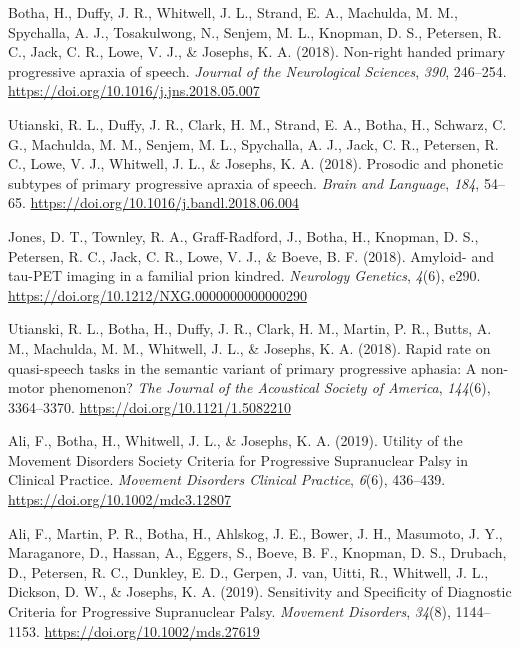 \documentclass[11pt, a4paper]{awesome-cv}
\begin{document}
\leavevmode\hypertarget{ref-botha_non-right_2018}{}%
Botha, H., Duffy, J. R., Whitwell, J. L., Strand, E. A., Machulda, M.
M., Spychalla, A. J., Tosakulwong, N., Senjem, M. L., Knopman, D. S.,
Petersen, R. C., Jack, C. R., Lowe, V. J., \& Josephs, K. A. (2018).
Non-right handed primary progressive apraxia of speech. \emph{Journal of
the Neurological Sciences}, \emph{390}, 246--254.
\url{https://doi.org/10.1016/j.jns.2018.05.007}

\leavevmode\hypertarget{ref-utianski_prosodic_2018}{}%
Utianski, R. L., Duffy, J. R., Clark, H. M., Strand, E. A., Botha, H.,
Schwarz, C. G., Machulda, M. M., Senjem, M. L., Spychalla, A. J., Jack,
C. R., Petersen, R. C., Lowe, V. J., Whitwell, J. L., \& Josephs, K. A.
(2018). Prosodic and phonetic subtypes of primary progressive apraxia of
speech. \emph{Brain and Language}, \emph{184}, 54--65.
\url{https://doi.org/10.1016/j.bandl.2018.06.004}

\leavevmode\hypertarget{ref-jones_amyloid-_2018}{}%
Jones, D. T., Townley, R. A., Graff-Radford, J., Botha, H., Knopman, D.
S., Petersen, R. C., Jack, C. R., Lowe, V. J., \& Boeve, B. F. (2018).
Amyloid- and tau-{PET} imaging in a familial prion kindred.
\emph{Neurology Genetics}, \emph{4}(6), e290.
\url{https://doi.org/10.1212/NXG.0000000000000290}

\leavevmode\hypertarget{ref-utianski_rapid_2018}{}%
Utianski, R. L., Botha, H., Duffy, J. R., Clark, H. M., Martin, P. R.,
Butts, A. M., Machulda, M. M., Whitwell, J. L., \& Josephs, K. A.
(2018). Rapid rate on quasi-speech tasks in the semantic variant of
primary progressive aphasia: {A} non-motor phenomenon? \emph{The Journal
of the Acoustical Society of America}, \emph{144}(6), 3364--3370.
\url{https://doi.org/10.1121/1.5082210}

\leavevmode\hypertarget{ref-ali_utility_2019}{}%
Ali, F., Botha, H., Whitwell, J. L., \& Josephs, K. A. (2019). Utility
of the {Movement} {Disorders} {Society} {Criteria} for {Progressive}
{Supranuclear} {Palsy} in {Clinical} {Practice}. \emph{Movement
Disorders Clinical Practice}, \emph{6}(6), 436--439.
\url{https://doi.org/10.1002/mdc3.12807}

\leavevmode\hypertarget{ref-ali_sensitivity_2019}{}%
Ali, F., Martin, P. R., Botha, H., Ahlskog, J. E., Bower, J. H.,
Masumoto, J. Y., Maraganore, D., Hassan, A., Eggers, S., Boeve, B. F.,
Knopman, D. S., Drubach, D., Petersen, R. C., Dunkley, E. D., Gerpen, J.
van, Uitti, R., Whitwell, J. L., Dickson, D. W., \& Josephs, K. A.
(2019). Sensitivity and {Specificity} of {Diagnostic} {Criteria} for
{Progressive} {Supranuclear} {Palsy}. \emph{Movement Disorders},
\emph{34}(8), 1144--1153. \url{https://doi.org/10.1002/mds.27619}
\end{document}
